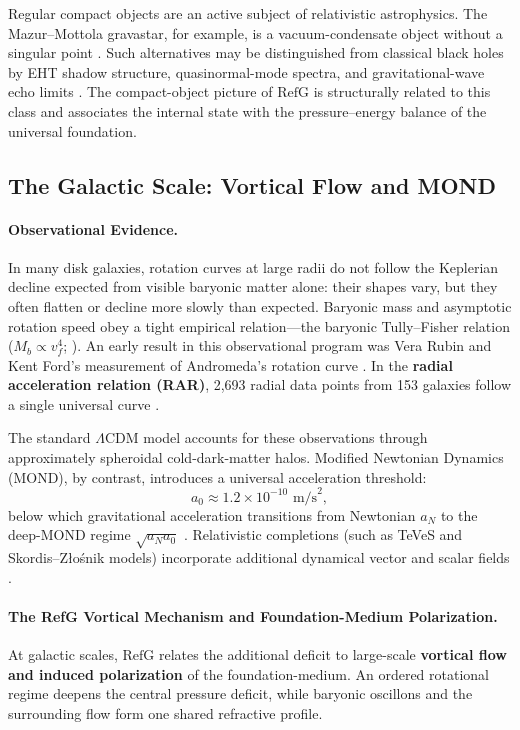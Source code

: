\documentclass[11pt,a4paper]{article}
\newcommand{\RefG}{\mathrm{RefG}}
\begin{document}
Regular compact objects are an active subject of relativistic astrophysics. The Mazur--Mottola gravastar, for example, is a vacuum-condensate object without a singular point \citep{mazur2004}. Such alternatives may be distinguished from classical black holes by EHT shadow structure, quasinormal-mode spectra, and gravitational-wave echo limits \citep{eventhorizon2019,cardoso2019}. The compact-object picture of $\RefG$ is structurally related to this class and associates the internal state with the pressure--energy balance of the universal foundation.

\subsection{The Galactic Scale: Vortical Flow and MOND}

\paragraph{Observational Evidence.} In many disk galaxies, rotation curves at large radii do not follow the Keplerian decline expected from visible baryonic matter alone: their shapes vary, but they often flatten or decline more slowly than expected. Baryonic mass and asymptotic rotation speed obey a tight empirical relation---the baryonic Tully--Fisher relation ($M_b \propto v_f^4$; \citealt{tully1977,lelli2016}). An early result in this observational program was Vera Rubin and Kent Ford's measurement of Andromeda's rotation curve \citep{rubin1970}. In the \textbf{radial acceleration relation (RAR)}, 2,693 radial data points from 153 galaxies follow a single universal curve \citep{mcgaugh2016}.

The standard $\Lambda$CDM model accounts for these observations through approximately spheroidal cold-dark-matter halos. Modified Newtonian Dynamics (MOND), by contrast, introduces a universal acceleration threshold:
\begin{equation}
a_0 \approx 1.2 \times 10^{-10} \text{ m/s}^2,
\end{equation}
below which gravitational acceleration transitions from Newtonian $a_N$ to the deep-MOND regime $\sqrt{a_N a_0}$ \citep{milgrom1983}. Relativistic completions (such as TeVeS and Skordis--Złośnik models) incorporate additional dynamical vector and scalar fields \citep{bekenstein2004,skordis2021}.

\paragraph{The RefG Vortical Mechanism and Foundation-Medium Polarization.} At galactic scales, $\RefG$ relates the additional deficit to large-scale \textbf{vortical flow and induced polarization} of the foundation-medium. An ordered rotational regime deepens the central pressure deficit, while baryonic oscillons and the surrounding flow form one shared refractive profile.
\end{document}
